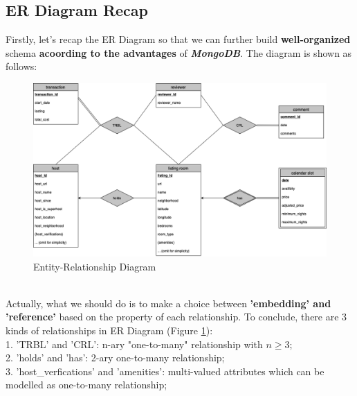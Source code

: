 \documentclass{article}
\begin{document}
	\subsection{ER Diagram Recap}
	Firstly, let's recap the ER Diagram so that we can further build \textbf{well-organized }schema \textbf{acoording to the advantages} of \textbf{\textit{MongoDB}}. The diagram is shown as follows:
	\begin{figure}[h]
		\centering
		\includegraphics[width=.45\textheight]{er.png}
		\caption{Entity-Relationship Diagram}
		\label{fig:018}
	\end{figure}
	\\
	Actually, what we should do is to make a choice between\textbf{ 'embedding' and 'reference'} based on the property of each relationship. To conclude, there are 3 kinds of relationships in ER Diagram (Figure \ref{fig:018}):
	\vspace{3pt}
	\\
	1. 'TRBL' and 'CRL': n-ary "one-to-many" relationship with $n \ge 3$;
	\\
	2. 'holds' and 'has': 2-ary one-to-many relationship;
	\\
	3. 'host\_verfications' and 'amenities': multi-valued attributes which can be modelled as one-to-many relationship;
\end{document}
